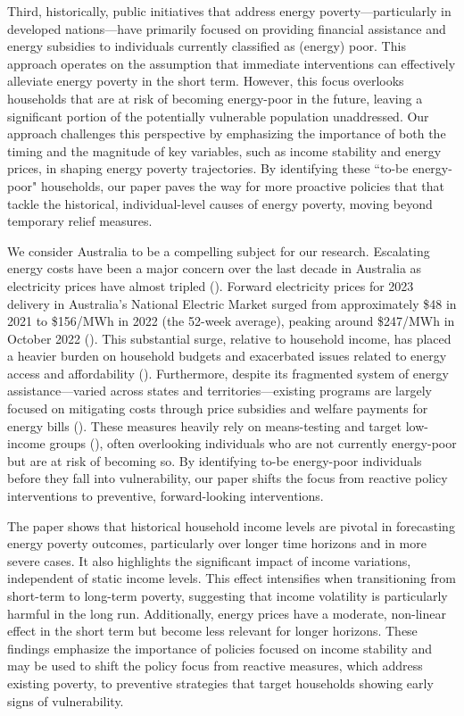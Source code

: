 \documentclass[preprint,authoryear,12pt]{elsarticle}
\newcommand{\citeTwo}[1]{(\cite{#1})}
\begin{document}
Third, historically, public initiatives that address energy poverty---particularly in developed nations---have primarily focused on providing financial assistance and energy subsidies to individuals currently classified as (energy) poor. This approach operates on the assumption that immediate interventions can effectively alleviate energy poverty in the short term. However, this focus overlooks households that are at risk of becoming energy-poor in the future, leaving a significant portion of the potentially vulnerable population unaddressed. Our approach challenges this perspective by emphasizing the importance of both the timing and the magnitude of key variables, such as income stability and energy prices, in shaping energy poverty trajectories. By identifying these ``to-be energy-poor" households, our paper paves the way for more proactive  policies that that tackle the historical, individual-level causes of energy poverty, moving beyond temporary relief measures.

We consider Australia to be a compelling subject for our research. Escalating energy costs have been a major concern over the last decade in Australia as electricity prices have almost tripled \citeTwo{Pro22}. Forward electricity prices for 2023 delivery in Australia’s National Electric Market surged from approximately \$48 in 2021 to \$156/MWh in 2022 (the 52-week average), peaking around \$247/MWh in October 2022 \citeTwo{Sim23}. This substantial surge, relative to household income, has placed a heavier burden on household budgets and exacerbated issues related to energy access and affordability \citeTwo{OECD23}. Furthermore, despite its fragmented system of energy assistance---varied across states and territories---existing programs are largely focused on mitigating costs through price subsidies and welfare payments for energy bills \citeTwo{Wil22}. These measures heavily rely on means-testing and target low-income groups \citeTwo{SM23}, often overlooking individuals who are not currently energy-poor but are at risk of becoming so. By identifying to-be energy-poor individuals before they fall into vulnerability, our paper shifts the focus from reactive policy interventions to preventive, forward-looking interventions.

The paper shows that historical household income levels are pivotal in forecasting energy poverty outcomes, particularly over longer time horizons and in more severe cases. It also highlights the significant impact of income variations, independent of static income levels. This effect intensifies when transitioning from short-term to long-term poverty, suggesting that income volatility is particularly harmful in the long run. Additionally, energy prices have a moderate, non-linear effect in the short term but become less relevant for longer horizons. These findings emphasize the importance of policies focused on income stability and may be used to shift the policy focus from reactive measures, which address existing poverty, to preventive strategies that target households showing early signs of vulnerability.
\end{document}
